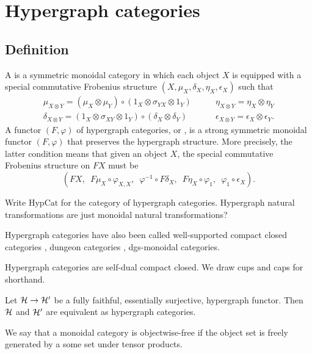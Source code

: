 \section{Hypergraph categories}

\subsection{Definition}
\begin{definition}
  A  is a symmetric monoidal category in which each
  object $X$ is equipped with a special commutative Frobenius structure
  $(X,\mu_X,\delta_X,\eta_X,\epsilon_X)$ such that 
\[
  \begin{array}{cc}
    \mu_{X\otimes Y} = (\mu_X \otimes \mu_Y)\circ(1_X \otimes \sigma_{YX}\otimes
    1_Y) \qquad&
    \eta_{X\otimes Y} = \eta_X \otimes \eta_Y \\
    \delta_{X\otimes Y} = (1_X \otimes \sigma_{XY}\otimes 1_Y)\circ(\delta_X
    \otimes \delta_Y) \qquad&
    \epsilon_{X\otimes Y} = \epsilon_X \otimes \epsilon_Y.
  \end{array}
\]
A functor $(F,\varphi)$ of hypergraph categories, or , is a strong symmetric monoidal functor $(F,\varphi)$ that preserves
the hypergraph structure. More precisely, the latter condition means that given
an object $X$, the special commutative Frobenius structure on $FX$ must be 
\[
  (FX,\enspace F\mu_X \circ \varphi_{X,X},\enspace  \varphi^{-1} \circ F\delta_X,\enspace  F\eta_X \circ
\varphi_1,\enspace  \varphi_1 \circ \epsilon_X).
\]
\end{definition}

Write $\mathrm{HypCat}$ for the category of hypergraph categories. Hypergraph
natural transformations are just monoidal natural transformations?

Hypergraph categories have also been called well-supported compact closed
categories \cite{Ca}, dungeon categories \cite{Mo}, dgs-monoidal categories. 

Hypergraph categories are self-dual compact closed. We draw cups and caps for
shorthand.

\begin{proposition}
  Let $\mathcal H \to \mathcal H'$ be a fully faithful, essentially surjective, hypergraph
  functor. Then $\mathcal H$ and $\mathcal H'$ are equivalent as hypergraph categories.
\end{proposition}

We say that a monoidal category is objectwise-free if the object set is freely
generated by a some set under tensor products.

